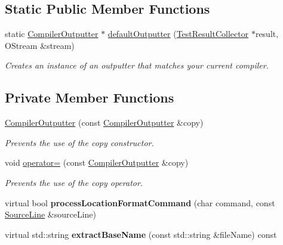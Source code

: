 \subsection*{Static Public Member Functions}
\begin{DoxyCompactItemize}
\item 
static \hyperlink{class_compiler_outputter}{Compiler\+Outputter} $\ast$ \hyperlink{class_compiler_outputter_aa0f8f9b1fb25fe8873b7454f91dcc929}{default\+Outputter} (\hyperlink{class_test_result_collector}{Test\+Result\+Collector} $\ast$result, O\+Stream \&stream)
\begin{DoxyCompactList}\small\item\em Creates an instance of an outputter that matches your current compiler. \end{DoxyCompactList}\end{DoxyCompactItemize}
\subsection*{Private Member Functions}
\begin{DoxyCompactItemize}
\item 
\hyperlink{class_compiler_outputter_a264ecb788d4f8665bc3c081b7c33efc4}{Compiler\+Outputter} (const \hyperlink{class_compiler_outputter}{Compiler\+Outputter} \&copy)\hypertarget{class_compiler_outputter_a264ecb788d4f8665bc3c081b7c33efc4}{}\label{class_compiler_outputter_a264ecb788d4f8665bc3c081b7c33efc4}

\begin{DoxyCompactList}\small\item\em Prevents the use of the copy constructor. \end{DoxyCompactList}\item 
void \hyperlink{class_compiler_outputter_a92a65f995856b0505d42c2fefac64828}{operator=} (const \hyperlink{class_compiler_outputter}{Compiler\+Outputter} \&copy)\hypertarget{class_compiler_outputter_a92a65f995856b0505d42c2fefac64828}{}\label{class_compiler_outputter_a92a65f995856b0505d42c2fefac64828}

\begin{DoxyCompactList}\small\item\em Prevents the use of the copy operator. \end{DoxyCompactList}\item 
virtual bool {\bfseries process\+Location\+Format\+Command} (char command, const \hyperlink{class_source_line}{Source\+Line} \&source\+Line)\hypertarget{class_compiler_outputter_a30a42dc8201fd0733921927f8c52c069}{}\label{class_compiler_outputter_a30a42dc8201fd0733921927f8c52c069}

\item 
virtual std\+::string {\bfseries extract\+Base\+Name} (const std\+::string \&file\+Name) const \hypertarget{class_compiler_outputter_afdad81173beaefa8d150f0446f0ab6b4}{}\label{class_compiler_outputter_afdad81173beaefa8d150f0446f0ab6b4}

\end{DoxyCompactItemize}
